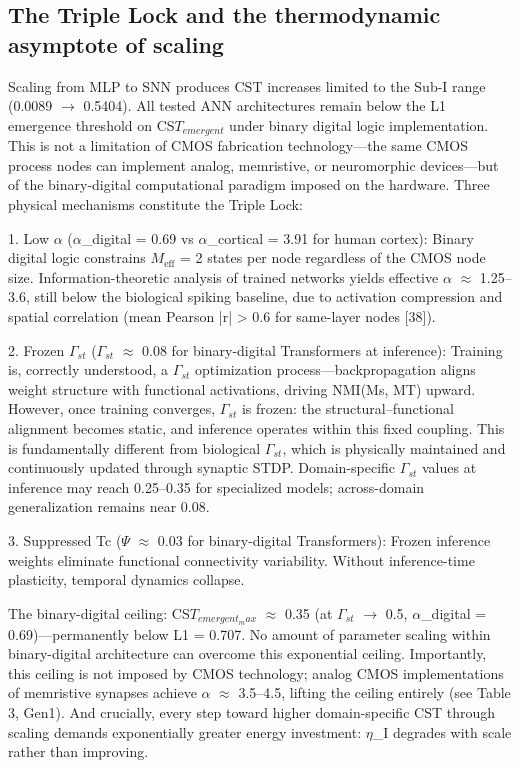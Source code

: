 \documentclass[a4paper,12pt]{article}
\begin{document}
\subsection{The Triple Lock and the thermodynamic asymptote of scaling}

Scaling from MLP to SNN produces CST increases limited to the Sub-I range (0.0089 $\rightarrow$ 0.5404). All tested ANN architectures remain below the L1 emergence threshold on CS$T_{emergent}$ under binary digital logic implementation. This is not a limitation of CMOS fabrication technology---the same CMOS process nodes can implement analog, memristive, or neuromorphic devices---but of the binary-digital computational paradigm imposed on the hardware. Three physical mechanisms constitute the Triple Lock:


1. Low $\alpha$ ($\alpha$_digital = 0.69 vs $\alpha$_cortical = 3.91 for human cortex): Binary digital logic constrains $M_{\text{eff}}$ = 2 states per node regardless of the CMOS node size. Information-theoretic analysis of trained networks yields effective $\alpha$ $\approx$ 1.25--3.6, still below the biological spiking baseline, due to activation compression and spatial correlation (mean Pearson |r| > 0.6 for same-layer nodes [38]).


2. Frozen $\Gamma_{st}$ ($\Gamma_{st}$ $\approx$ 0.08 for binary-digital Transformers at inference): Training is, correctly understood, a $\Gamma_{st}$ optimization process---backpropagation aligns weight structure with functional activations, driving NMI(Ms, MT) upward. However, once training converges, $\Gamma_{st}$ is frozen: the structural--functional alignment becomes static, and inference operates within this fixed coupling. This is fundamentally different from biological $\Gamma_{st}$, which is physically maintained and continuously updated through synaptic STDP. Domain-specific $\Gamma_{st}$ values at inference may reach 0.25--0.35 for specialized models; across-domain generalization remains near 0.08.


3. Suppressed Tc ($\Psi$ $\approx$ 0.03 for binary-digital Transformers): Frozen inference weights eliminate functional connectivity variability. Without inference-time plasticity, temporal dynamics collapse.


The binary-digital ceiling: CS$T_{emergent_max}$ $\approx$ 0.35 (at $\Gamma_{st}$ $\rightarrow$ 0.5, $\alpha$_digital = 0.69)---permanently below L1 = 0.707. No amount of parameter scaling within binary-digital architecture can overcome this exponential ceiling. Importantly, this ceiling is not imposed by CMOS technology; analog CMOS implementations of memristive synapses achieve $\alpha$ $\approx$ 3.5--4.5, lifting the ceiling entirely (see Table 3, Gen1). And crucially, every step toward higher domain-specific CST through scaling demands exponentially greater energy investment: $\eta$_I degrades with scale rather than improving.
\end{document}
